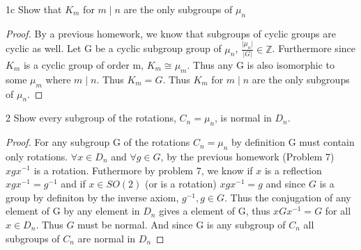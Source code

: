 \documentclass{article}
\newcommand{\Z}{\mathbb{Z}}
\newcommand{\abs}[1]{\lvert #1\rvert}
\begin{document}
\begin{claim}{1c}
    Show that $K_m$ for $m \mid n$ are the only subgroups of $\mu_n$
\end{claim}
\begin{proof}
    By a previous homework, we know that subgroups of cyclic groups are cyclic as well. Let G be a cyclic subgroup group of $\mu_n$, $\frac{\abs{\mu_n}}{\abs{G}} \in \Z$. Furthermore since $K_m$ is a cyclic group of order m, $K_m \cong \mu_m$. Thus any G is also isomorphic to some $\mu_m$ where $m \mid n$. Thus $K_m = G$. Thus $K_m$ for $m \mid n$ are the only subgroups of $\mu_n$.
\end{proof}

\bigskip

\begin{claim}{2}
    Show every subgroup of the rotations, $C_n = \mu_n$, is normal in $D_n$.
\end{claim}
\begin{proof}
    For any subgroup G of the rotations $C_n = \mu_n$ by definition G must contain only rotations. $\forall x \in D_n$ and $\forall g \in G$, by the previous homework (Problem 7) $xgx^{-1}$ is a rotation. Futhermore by problem 7, we know if $x$ is a reflection $xgx^{-1} = g^{-1}$ and if $x \in SO(2)$ (or is a rotation) $xgx^{-1} = g$ and since $G$ is a group by definiton by the inverse axiom, $g^{-1}, g \in G$. Thus the conjugation of any element of G by any element in $D_n$ gives a element of G, thus $xGx^{-1} = G$ for all $x \in D_n$. Thus $G$ must be normal. And since G is any subgroup of $C_n$ all subgroups of $C_n$ are normal in $D_n$
\end{proof}

\bigskip
\end{document}
